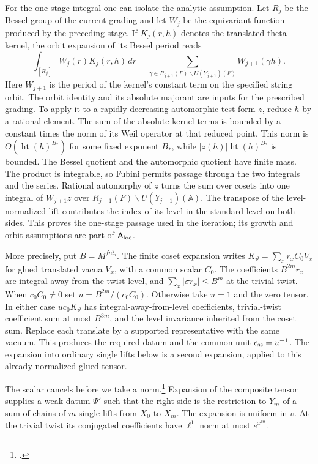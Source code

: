 For the one-stage integral one can isolate the analytic assumption. Let $R_j$ be the Bessel group of the current grading and let $W_j$ be the equivariant function produced by the preceding stage. If $K_j(r,h)$ denotes the translated theta kernel, the orbit expansion of its Bessel period reads
\[
 \int_{[R_j]}W_j(r)K_j(r,h)\,dr
 =\sum_{\gamma\in R_{j+1}(F)\backslash U(Y_{j+1})(F)}
          W_{j+1}(\gamma h).
\]
Here $W_{j+1}$ is the period of the kernel's constant term on the specified string orbit. The orbit identity and its absolute majorant are inputs for the prescribed grading. To apply it to a rapidly decreasing automorphic test form $z$, reduce $h$ by a rational element. The sum of the absolute kernel terms is bounded by a constant times the norm of its Weil operator at that reduced point. This norm is $O(\operatorname{ht}(h)^{B_*})$ for some fixed exponent $B_*$, while $|z(h)|\operatorname{ht}(h)^{B_*}$ is bounded. The Bessel quotient and the automorphic quotient have finite mass. The product is integrable, so Fubini permits passage through the two integrals and the series. Rational automorphy of $z$ turns the sum over cosets into one integral of $W_{j+1}z$ over $R_{j+1}(F)\backslash U(Y_{j+1})(\mathbb A)$. The transpose of the level-normalized lift contributes the index of its level in the standard level on both sides. This proves the one-stage passage used in the iteration; its growth and orbit assumptions are part of $\mathsf A_{\rm loc}$.

More precisely, put $B=M^{fn_m^2}$. The finite coset expansion writes $K_\vartheta=\sum_x r_x C_0 V_x$ for glued translated vacua $V_x$, with a common scalar $C_0$. The coefficients $B^{2m}r_x$ are integral away from the twist level, and $\sum_x|\sigma r_x|\le B^m$ at the trivial twist. When $c_0 C_0\ne0$ set $u=B^{2m}/(c_0C_0)$. Otherwise take $u=1$ and the zero tensor. In either case $u c_0K_\vartheta$ has integral-away-from-level coefficients, trivial-twist coefficient sum at most $B^{3m}$, and the level invariance inherited from the coset sum. Replace each translate by a supported representative with the same vacuum. This produces the required datum and the common unit $c_{\rm ss}=u^{-1}$. The expansion into ordinary single lifts below is a second expansion, applied to this already normalized glued tensor.

The scalar cancels before we take a norm.\footnote{.} Expansion of the composite tensor supplies a weak datum $\Psi'$ such that the right side is the restriction to $Y_m$ of a sum of chains of $m$ single lifts from $X_0$ to $X_m$. The expansion is uniform in $v$. At the trivial twist its conjugated coefficients have $\ell^1$ norm at most $e^{x^{60}}$.

